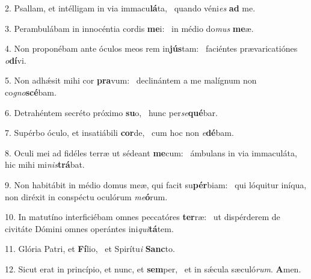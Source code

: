 2. Psallam, et intélligam in via immacu\textbf{lá}ta, \ast\  quando véni\textit{es} \textbf{ad} me.\

3. Perambulábam in innocéntia cordis \textbf{me}i: \ast\  in médio do\textit{mus} \textbf{me}æ.\

4. Non proponébam ante óculos meos rem in\textbf{jús}tam: \ast\  faciéntes prævaricatiónes \textit{o}\textbf{dí}vi.\

5. Non adhǽsit mihi cor \textbf{pra}vum: \ast\  declinántem a me malígnum non co\textit{gno}\textbf{scé}bam.\

6. Detrahéntem secréto próximo \textbf{su}o, \ast\  hunc per\textit{se}\textbf{qué}bar.\

7. Supérbo óculo, et insatiábili \textbf{cor}de, \ast\  cum hoc non \textit{e}\textbf{dé}bam.\

8. Oculi mei ad fidéles terræ ut sédeant \textbf{me}cum: \ast\  ámbulans in via immaculáta, hic mihi mi\textit{nis}\textbf{trá}bat.\

9. Non habitábit in médio domus meæ, qui facit su\textbf{pér}biam: \ast\  qui lóquitur iníqua, non diréxit in conspéctu oculórum \textit{me}\textbf{ó}rum.\

10. In matutíno interficiébam omnes peccatóres \textbf{ter}ræ: \ast\  ut dispérderem de civitáte Dómini omnes operántes ini\textit{qui}\textbf{tá}tem.\

11. Glória Patri, et \textbf{Fí}lio, \ast\  et Spirítu\textit{i} \textbf{Sanc}to.\

12. Sicut erat in princípio, et nunc, et \textbf{sem}per, \ast\  et in sǽcula sæculó\textit{rum}. \textbf{A}men.\

